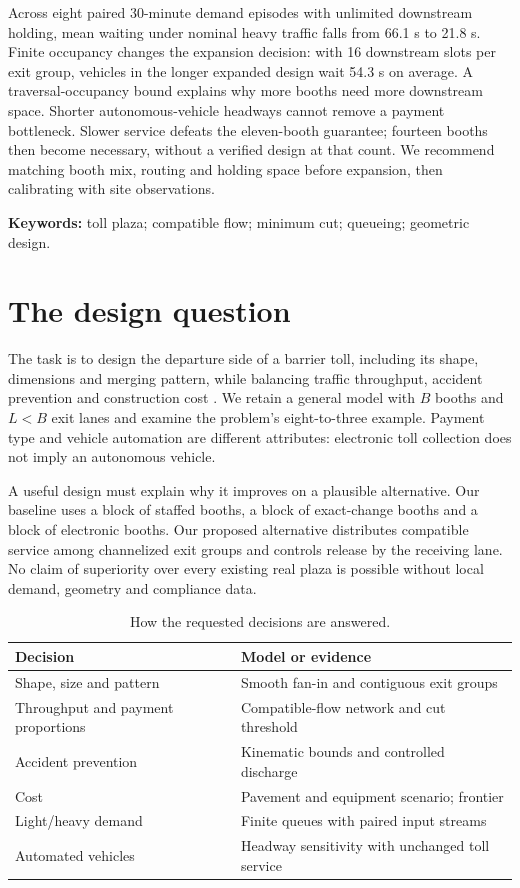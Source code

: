\documentclass[12pt,letterpaper]{article}
\begin{document}
Across eight paired 30-minute demand episodes with unlimited downstream holding, mean waiting under nominal heavy traffic falls from 66.1 s to 21.8 s. Finite occupancy changes the expansion decision: with 16 downstream slots per exit group, vehicles in the longer expanded design wait 54.3 s on average. A traversal-occupancy bound explains why more booths need more downstream space. Shorter autonomous-vehicle headways cannot remove a payment bottleneck. Slower service defeats the eleven-booth guarantee; fourteen booths then become necessary, without a verified design at that count. We recommend matching booth mix, routing and holding space before expansion, then calibrating with site observations.

\noindent\textbf{Keywords:} toll plaza; compatible flow; minimum cut; queueing; geometric design.
\clearpage\tableofcontents\clearpage
\section{The design question}
The task is to design the departure side of a barrier toll, including its shape, dimensions and merging pattern, while balancing traffic throughput, accident prevention and construction cost \cite{comap}. We retain a general model with $B$ booths and $L<B$ exit lanes and examine the problem's eight-to-three example. Payment type and vehicle automation are different attributes: electronic toll collection does not imply an autonomous vehicle.

A useful design must explain why it improves on a plausible alternative. Our baseline uses a block of staffed booths, a block of exact-change booths and a block of electronic booths. Our proposed alternative distributes compatible service among channelized exit groups and controls release by the receiving lane. No claim of superiority over every existing real plaza is possible without local demand, geometry and compliance data.

\begin{table}[H]\centering\small\caption{How the requested decisions are answered.}\begin{tabular}{@{}p{.32\linewidth}p{.61\linewidth}@{}}\toprule
Decision & Model or evidence\\\midrule
Shape, size and pattern & Smooth fan-in and contiguous exit groups\\
Throughput and payment proportions & Compatible-flow network and cut threshold\\
Accident prevention & Kinematic bounds and controlled discharge\\
Cost & Pavement and equipment scenario; frontier\\
Light/heavy demand & Finite queues with paired input streams\\
Automated vehicles & Headway sensitivity with unchanged toll service\\
\bottomrule\end{tabular}\end{table}
\end{document}
